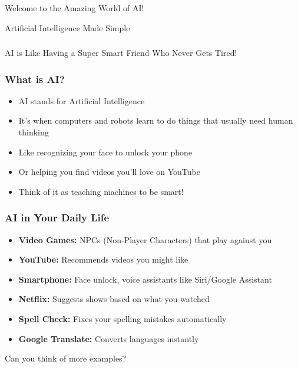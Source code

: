 \begin{frame}[fragile]\frametitle{}
\begin{center}
{\Large Welcome to the Amazing World of AI!}

\vspace{1cm}
{\large Artificial Intelligence Made Simple}
\end{center}
\end{frame}

\begin{frame}[fragile]\frametitle{}
\begin{center}
{\Large AI is Like Having a Super Smart Friend Who Never Gets Tired!}
\end{center}
\end{frame}

\begin{frame}[fragile]\frametitle{What is AI?}
\begin{itemize}
\item AI stands for Artificial Intelligence
\item It's when computers and robots learn to do things that usually need human thinking
\item Like recognizing your face to unlock your phone
\item Or helping you find videos you'll love on YouTube
\item Think of it as teaching machines to be smart!
\end{itemize}
\end{frame}

\begin{frame}[fragile]\frametitle{AI in Your Daily Life}
\begin{itemize}
\item {\bf Video Games:} NPCs (Non-Player Characters) that play against you
\item {\bf YouTube:} Recommends videos you might like
\item {\bf Smartphone:} Face unlock, voice assistants like Siri/Google Assistant
\item {\bf Netflix:} Suggests shows based on what you watched
\item {\bf Spell Check:} Fixes your spelling mistakes automatically
\item {\bf Google Translate:} Converts languages instantly
\end{itemize}
Can you think of more examples?
\end{frame}
